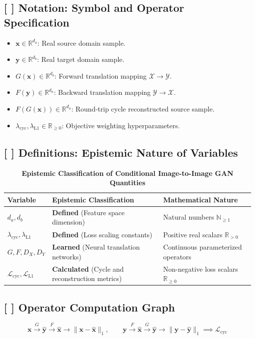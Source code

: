 \documentclass[11pt,a4paper]{article}
\theoremstyle{definition}
\begin{document}
\subsection{[ ] Notation: Symbol and Operator Specification}
\begin{itemize}
    \item $\mathbf{x} \in \mathbb{R}^{d_a}$: Real source domain sample.
    \item $\mathbf{y} \in \mathbb{R}^{d_b}$: Real target domain sample.
    \item $G(\mathbf{x}) \in \mathbb{R}^{d_b}$: Forward translation mapping $\mathcal{X} \to \mathcal{Y}$.
    \item $F(\mathbf{y}) \in \mathbb{R}^{d_a}$: Backward translation mapping $\mathcal{Y} \to \mathcal{X}$.
    \item $F(G(\mathbf{x})) \in \mathbb{R}^{d_a}$: Round-trip cycle reconstructed source sample.
    \item $\lambda_{\text{cyc}}, \lambda_{\text{L1}} \in \mathbb{R}_{\ge 0}$: Objective weighting hyperparameters.
\end{itemize}

\subsection{[ ] Definitions: Epistemic Nature of Variables}
\begin{table}[h]
\centering
\caption{\textbf{Epistemic Classification of Conditional Image-to-Image GAN Quantities}}
\begin{tabular}{lll}
\toprule
\textbf{Variable} & \textbf{Epistemic Classification} & \textbf{Mathematical Nature} \\
\midrule
$d_a, d_b$ & \textbf{Defined} (Feature space dimension) & Natural numbers $\mathbb{N}_{\ge 1}$ \\
$\lambda_{\text{cyc}}, \lambda_{\text{L1}}$ & \textbf{Defined} (Loss scaling constants) & Positive real scalars $\mathbb{R}_{> 0}$ \\
$G, F, D_X, D_Y$ & \textbf{Learned} (Neural translation networks) & Continuous parameterized operators \\
$\mathcal{L}_{\text{cyc}}, \mathcal{L}_{\text{L1}}$ & \textbf{Calculated} (Cycle and reconstruction metrics) & Non-negative loss scalars $\mathbb{R}_{\ge 0}$ \\
\bottomrule
\end{tabular}
\end{table}

\subsection{[ ] Operator Computation Graph}
{\boldmath
\begin{equation}
\mathbf{x} \xrightarrow{G} \hat{\mathbf{y}} \xrightarrow{F} \hat{\mathbf{x}} \longrightarrow \|\mathbf{x} - \hat{\mathbf{x}}\|_1, \qquad \mathbf{y} \xrightarrow{F} \hat{\mathbf{x}} \xrightarrow{G} \hat{\mathbf{y}} \longrightarrow \|\mathbf{y} - \hat{\mathbf{y}}\|_1 \implies \mathcal{L}_{\text{cyc}}
\end{equation}
}
\end{document}
